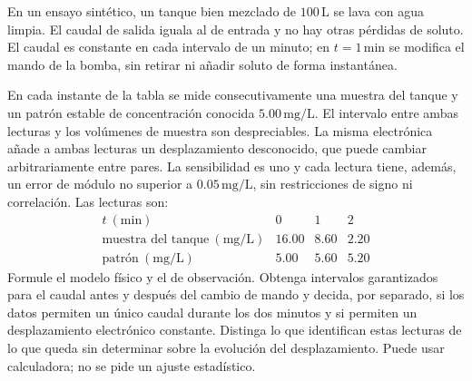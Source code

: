 En un ensayo sintético, un tanque bien mezclado de \(100\,\mathrm L\) se lava con agua limpia. El caudal de salida iguala al de entrada y no hay otras pérdidas de soluto. El caudal es constante en cada intervalo de un minuto; en \(t=1\,\mathrm{min}\) se modifica el mando de la bomba, sin retirar ni añadir soluto de forma instantánea.

En cada instante de la tabla se mide consecutivamente una muestra del tanque y un patrón estable de concentración conocida \(5.00\,\mathrm{mg/L}\). El intervalo entre ambas lecturas y los volúmenes de muestra son despreciables. La misma electrónica añade a ambas lecturas un desplazamiento desconocido, que puede cambiar arbitrariamente entre pares. La sensibilidad es uno y cada lectura tiene, además, un error de módulo no superior a \(0.05\,\mathrm{mg/L}\), sin restricciones de signo ni correlación. Las lecturas son:
\[
\begin{array}{c|rrr}
t\ (\mathrm{min})&0&1&2\\\hline
\text{muestra del tanque}\ (\mathrm{mg/L})&16.00&8.60&2.20\\
\text{patrón}\ (\mathrm{mg/L})&5.00&5.60&5.20
\end{array}
\]
Formule el modelo físico y el de observación. Obtenga intervalos garantizados para el caudal antes y después del cambio de mando y decida, por separado, si los datos permiten un único caudal durante los dos minutos y si permiten un desplazamiento electrónico constante. Distinga lo que identifican estas lecturas de lo que queda sin determinar sobre la evolución del desplazamiento. Puede usar calculadora; no se pide un ajuste estadístico.
